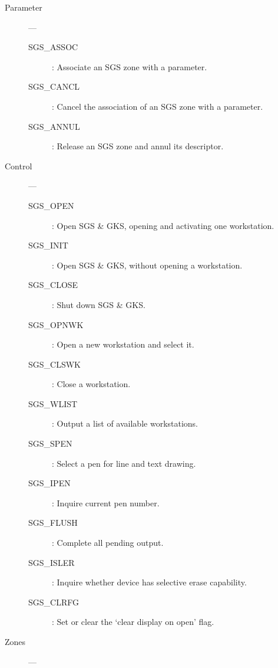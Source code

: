 \begin{description}

\item [Parameter] ---

\begin{description}
\item [SGS\_ASSOC] : Associate an SGS zone with a parameter.
\item [SGS\_CANCL] : Cancel the association of an SGS zone with a parameter.
\item [SGS\_ANNUL] : Release an SGS zone and annul its descriptor.
\end{description}

\item [Control] ---

\begin{description}
\item [SGS\_OPEN] : Open SGS \& GKS, opening and activating one workstation.
\item [SGS\_INIT] : Open SGS \& GKS, without opening a workstation.
\item [SGS\_CLOSE] : Shut down SGS \& GKS.
\item [SGS\_OPNWK] : Open a new workstation and select it.
\item [SGS\_CLSWK] : Close a workstation.
\item [SGS\_WLIST] : Output a list of available workstations.
\item [SGS\_SPEN] : Select a pen for line and text drawing.
\item [SGS\_IPEN] : Inquire current pen number.
\item [SGS\_FLUSH] : Complete all pending output.
\item [SGS\_ISLER] : Inquire whether device has selective erase capability.
\item [SGS\_CLRFG] : Set or clear the `clear display on open' flag.
\end{description}

\item [Zones] ---


\end{description}
